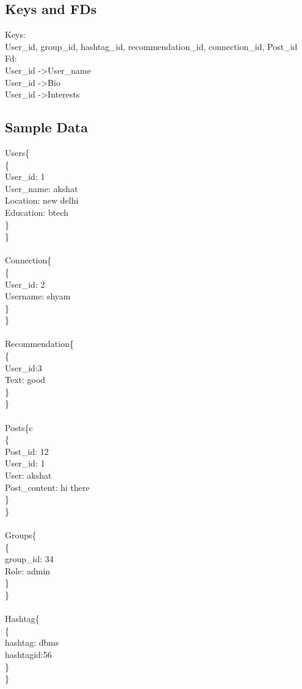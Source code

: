 \documentclass[10pt]{article}
\begin{document}
\subsection{Keys and FDs}
Keys: \\
User\_id, group\_id, hashtag\_id, recommendation\_id, connection\_id, Post\_id \\
Fd: \\
User\_id -\textgreater User\_name \\
User\_id -\textgreater Bio \\
User\_id -\textgreater Interests \\

\subsection{Sample Data}
Users\{ \\
	\{ \\
		User\_id: 1 \\
		User\_name: akshat \\
		Location: new delhi \\
		Education: btech \\
	\} \\
\}\\
\\
Connection\{ \\
	\{\\
		User\_id: 2 \\ 
		Username: shyam \\
	\} \\
\} \\
\\
Recommendation\{ \\
	\{ \\
		User\_id:3 \\ 
		Text: good \\
	\} \\
\} \\
\\
Posts\{c\\
	\{ \\
		Post\_id: 12 \\
		User\_id: 1 \\ 
		User: akshat \\
		Post\_content: hi there \\
	\} \\
\} \\
\\
Groups\{ \\
	\{ \\
		group\_id: 34 \\
		Role: admin \\
	\} \\
\} \\
\\
Hashtag\{ \\
	\{ \\ 
		hashtag: dbms \\
		hashtagid:56 \\
	\} \\
\} \\
\\
\end{document}
